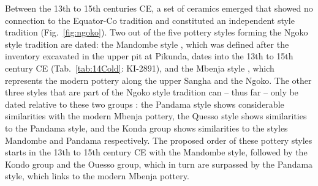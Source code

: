 \documentclass[smallextended,natbib]{svjour3}       %
\begin{document}
Between the 13th to 15th centuries CE, a set of ceramics emerged that showed no connection to the Equator-Co tradition and constituted an independent style tradition (Fig.~\ref{fig:ngoko}). Two out of the five pottery styles forming the Ngoko style tradition are dated: the Mandombe style \citep[145--148]{Seidensticker.2021e}, which was defined after the inventory excavated in the upper pit at Pikunda, dates into the 13th to 15th century CE (Tab.~\ref{tab:14Cold}: KI-2891), and the Mbenja style \citep[158--162]{Seidensticker.2021e}, which represents the modern pottery along the upper Sangha and the Ngoko. The other three styles that are part of the Ngoko style tradition can -- thus far -- only be dated relative to these two groups \citep[121--123 Fig.~6.5]{Seidensticker.2016b}: the Pandama style \citep[155--158]{Seidensticker.2021e} shows considerable similarities with the modern Mbenja pottery, the Quesso style \citep[152--155]{Seidensticker.2021e} shows similarities to the Pandama style, and the Konda group \citep[148--152]{Seidensticker.2021e} shows similarities to the styles Mandombe and Pandama respectively. The proposed order of these pottery styles starts in the 13th to 15th century CE with the Mandombe style, followed by the Kondo group and the Ouesso group, which in turn are surpassed by the Pandama style, which links to the modern Mbenja pottery.
\end{document}

